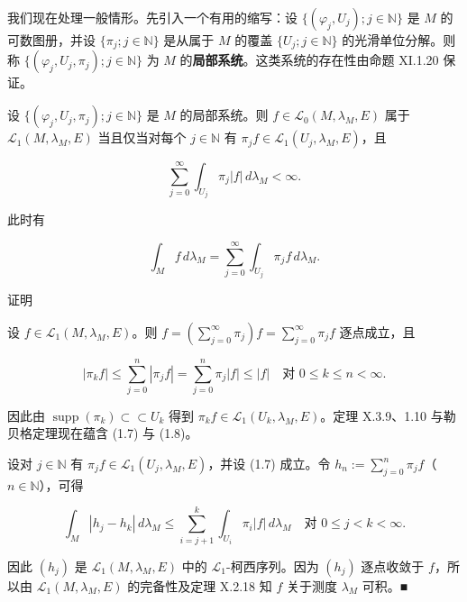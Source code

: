 我们现在处理一般情形。先引入一个有用的缩写：设 $ \{(\varphi_j, U_j) ; j \in \mathbb{N}\} $ 是 $ M $ 的可数图册，并设 $ \{\pi_j ; j \in \mathbb{N}\} $ 是从属于 $ M $ 的覆盖 $ \{U_j ; j \in \mathbb{N}\} $ 的光滑单位分解。则称 $ \{(\varphi_j, U_j, \pi_j) ; j \in \mathbb{N}\} $ 为 $ M $ 的\textbf{局部系统}。这类系统的存在性由命题 XI.1.20 保证。

\begin{proposition}

设 $ \{(\varphi_j, U_j, \pi_j) ; j \in \mathbb{N}\} $ 是 $ M $ 的局部系统。则 $ f \in \mathcal{L}_0(M, \lambda_M, E) $ 属于 $ \mathcal{L}_1(M, \lambda_M, E) $ 当且仅当对每个 $ j \in \mathbb{N} $ 有 $ \pi_j f \in \mathcal{L}_1(U_j, \lambda_M, E) $，且

\begin{equation}
\sum_{j=0}^{\infty} \int_{U_j} \pi_j |f| \, d\lambda_M < \infty .\tag{1.7}
\end{equation}

此时有

\begin{equation}
\int_M f \, d\lambda_M = \sum_{j=0}^{\infty} \int_{U_j} \pi_j f \, d\lambda_M .\tag{1.8}
\end{equation}

证明

\begin{subitems}
\item

设 $ f \in \mathcal{L}_1(M, \lambda_M, E) $。则 $ f = (\sum_{j=0}^{\infty}\pi_j)f = \sum_{j=0}^{\infty}\pi_j f $ 逐点成立，且

\[
|\pi_k f| \le \sum_{j=0}^{n} |\pi_j f| = \sum_{j=0}^{n} \pi_j |f| \le |f| \quad \text{对 } 0 \le k \le n < \infty .
\]

因此由 $ \operatorname{supp}(\pi_k) \subset\subset U_k $ 得到 $ \pi_k f \in \mathcal{L}_1(U_k, \lambda_M, E) $。定理 X.3.9、1.10 与勒贝格定理现在蕴含 (1.7) 与 (1.8)。

\item

设对 $ j \in \mathbb{N} $ 有 $ \pi_j f \in \mathcal{L}_1(U_j, \lambda_M, E) $，并设 (1.7) 成立。令 $ h_n := \sum_{j=0}^{n} \pi_j f $（$ n \in \mathbb{N} $），可得

\[
\int_M |h_j - h_k| \, d\lambda_M \le \sum_{i=j+1}^{k} \int_{U_i} \pi_i |f| \, d\lambda_M \quad \text{对 } 0 \le j < k < \infty .
\]

因此 $ (h_j) $ 是 $ \mathcal{L}_1(M, \lambda_M, E) $ 中的 $ \mathcal{L}_1 $-柯西序列。因为 $ (h_j) $ 逐点收敛于 $ f $，所以由 $ \mathcal{L}_1(M, \lambda_M, E) $ 的完备性及定理 X.2.18 知 $ f $ 关于测度 $ \lambda_M $ 可积。\nobreak\hspace{0.35em}■

\end{subitems}

\end{proposition}

